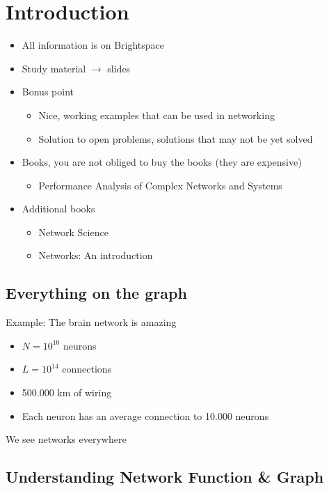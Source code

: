 
\section{Introduction}

\begin{itemize}
  \item All information is on Brightspace
  \item Study material $\rightarrow$ slides
  \item Bonus point
  \begin{itemize}
    \item Nice, working examples that can be used in networking
    \item Solution to open problems, solutions that may not be yet solved
  \end{itemize}
  \item Books, you are not obliged to buy the books (they are expensive)
  \begin{itemize}
    \item Performance Analysis of Complex Networks and Systems
  \end{itemize}
  \item Additional books
  \begin{itemize}
    \item Network Science
    \item Networks: An introduction
  \end{itemize}
\end{itemize}

\subsection{Everything on the graph}

Example: The brain network is amazing
\begin{itemize}
  \item $N=10^{10}$ neurons
  \item $L=10^{14}$ connections
  \item 500.000 km of wiring
  \item Each neuron has an average connection to 10.000 neurons
\end{itemize}

We see networks everywhere

\subsection{Understanding Network Function \& Graph}


